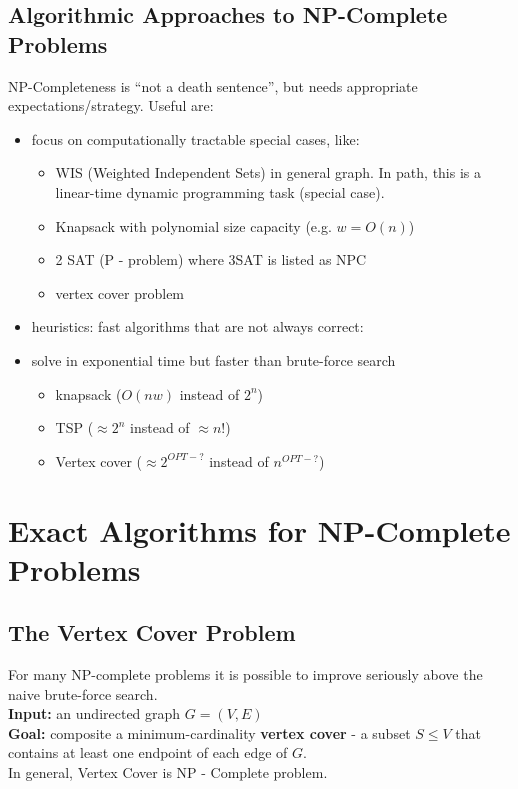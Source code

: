 \documentclass{scrartcl}
\begin{document}
\subsection{Algorithmic Approaches to NP-Complete Problems}
\label{sec:16-6}
NP-Completeness is ``not a death sentence'', but needs appropriate expectations/strategy. Useful are:
\begin{itemize}
\item focus on computationally tractable special cases, like:
  \begin{itemize}
  \item  WIS (Weighted  Independent Sets) in general graph. In path, this is a linear-time dynamic  programming task (special case).  
  \item Knapsack with polynomial size capacity (e.g. $w = O(n)$)
  \item 2 SAT (P - problem) where 3SAT is listed as NPC
  \item vertex cover problem
  \end{itemize}
\item heuristics: fast algorithms that are not always correct:
\item solve in exponential time but faster than brute-force search
  \begin{itemize}
  \item knapsack ($O(nw)$ instead of $2^n$)
  \item TSP ($\approx 2^n$ instead of $\approx n!$)
  \item Vertex cover ($\approx 2^{OPT-?}$ instead of $n^{OPT-?}$)
  \end{itemize}
\end{itemize}

\section{Exact Algorithms for NP-Complete Problems}
\label{sec:17-0}
\subsection{The Vertex Cover Problem}
\label{sec:17-1}
For many NP-complete problems it is possible to improve seriously above the
naive brute-force search.\\
{\bf Input: } an undirected graph $G=(V, E)$\\
{\bf Goal: } composite a minimum-cardinality {\bf vertex cover } - a subset $S
\leq V$ that contains at least one endpoint of each edge of $G$.\\
In general, Vertex Cover is NP - Complete problem.
\end{document}
